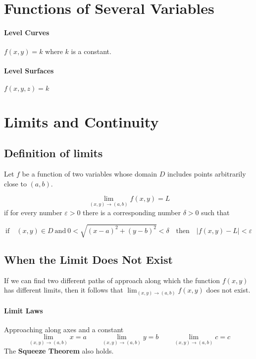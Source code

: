 \documentclass{report}  %
\begin{document}
\setcounter{chapter}{14}
\section{Functions of Several Variables}
\paragraph{Level Curves} 
 $f(x,y)=k$ where $k$ is a constant.
 
\paragraph{Level Surfaces}
$f(x,y,z)=k$

\section{Limits and Continuity}
\subsection*{Definition of limits} 
Let $f$ be a function of two variables whose domain $D$ includes points arbitrarily close to $(a, b)$. 

\begin{equation}
	\lim_{(x,y) \to (a,b)} f(x, y) = L
\end{equation}
if for every number $\varepsilon > 0$ there is a corresponding number $\delta > 0$ such that 

\begin{equation}
	\text{if} \quad (x,y) \in D  \ \text{and} \ 0 < \sqrt{(x-a)^2 + (y-b)^2} < \delta \quad 
	\text{then} \quad |f(x,y) - L| < \varepsilon
\end{equation}

 
\subsection*{When the Limit Does Not Exist} 
If we can find two different paths of approach along which the function $f(x, y)$ has different limits, then it follows that $\lim_{(x, y) \to (a, b)} f(x, y)$ does not exist. 

\paragraph{Limit Laws} Approaching along axes and a constant
\begin{equation}
	\lim_{(x,y) \to (a,b)} x = a \qquad
	\lim_{(x,y) \to (a,b)} y = b \qquad
	\lim_{(x,y) \to (a,b)} c = c
\end{equation}
The \textbf{Squeeze Theorem} also holds.
\end{document}

